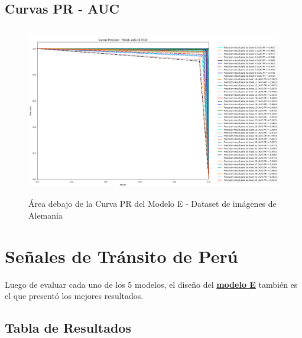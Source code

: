 		\subsection{Curvas PR - AUC}  
					\begin{figure}[H]
						\includegraphics[width=\textwidth, height=7.5cm]{images/desarrollo/testResults/german/PR_curve_modelE} 
						\begin{center}
						\caption{\small{Área debajo de la Curva PR del Modelo E - Dataset de imágenes de Alemania}}
						{\small{\fontsize{10}{16.8}\selectfont {Fuente: Elaboración propia}}}
						\end{center}
						\vspace{-1.5em}
					\end{figure}		
	
	\section{Señales de Tránsito de Perú}

		Luego de evaluar cada uno de los 5 modelos, el diseño del \underline{\bf modelo E} también es el que presentó los mejores resultados.

		\subsection{Tabla de Resultados}

